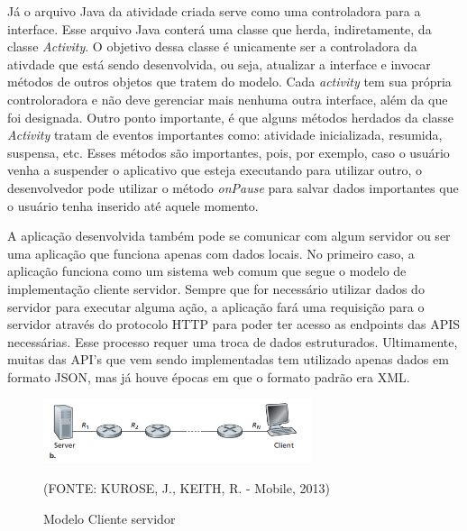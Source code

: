 \documentclass[
    12pt,       %
    openright,      %
    twoside,      %
    a4paper,      %
    english,      %
    french,       %
    spanish,      %
    brazil,       %
    ]{abntex2}
\begin{document}
        Já o arquivo Java da atividade criada serve como uma controladora para a interface. Esse
        arquivo Java conterá uma classe que herda, indiretamente, da classe \textit{Activity}. O
        objetivo dessa classe é unicamente ser a controladora da ativdade que está sendo
        desenvolvida, ou seja, atualizar a interface e invocar métodos de outros objetos que tratem
        do modelo. Cada \textit{activity} tem sua própria controloradora e não deve gerenciar mais
        nenhuma outra interface, além da que foi designada. Outro ponto importante, é que alguns métodos
        herdados da classe \textit{Activity} tratam de eventos importantes como: atividade inicializada,
        resumida, suspensa, etc. Esses métodos são importantes, pois, por exemplo, caso o usuário
        venha a suspender o aplicativo que esteja executando para utilizar outro, o desenvolvedor
        pode utilizar o método \textit{onPause} para salvar dados importantes que o usuário tenha
        inserido até aquele momento.

        A aplicação desenvolvida também pode se comunicar com algum servidor ou ser uma aplicação
        que funciona apenas com dados locais. No primeiro caso, a aplicação funciona como um sistema
        web comum que segue o modelo de implementação cliente servidor. Sempre que for necessário
        utilizar dados do servidor para executar alguma ação, a aplicação fará uma requisição para
        o servidor através do protocolo HTTP para poder ter acesso as endpoints das APIS
        necessárias. Esse processo requer uma troca de dados estruturados. Ultimamente, muitas das
        API's que vem sendo implementadas tem utilizado apenas dados em formato JSON, mas já houve
        épocas em que o formato padrão era XML.

        \begin{figure}[htbp]
            \begin{center}
                \includegraphics[width=0.7\textwidth]{img/clientServer.png}
            \end{center}
        \caption{\label{fig:passaro} Modelo Cliente servidor}
        \begin{center}(FONTE: KUROSE, J., KEITH, R. - Mobile, 2013)\end{center}
        \end{figure}
\end{document}
